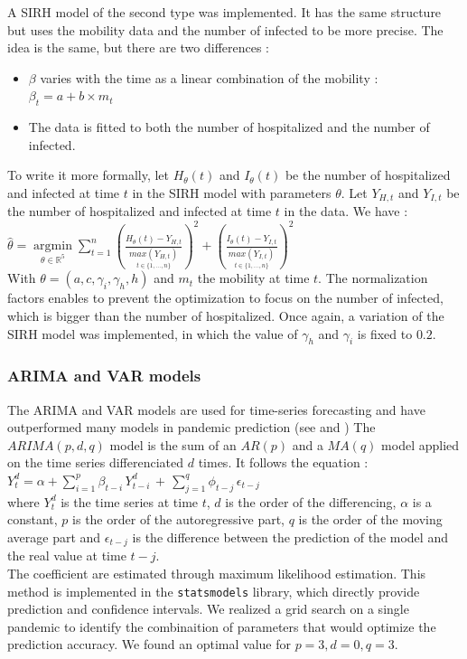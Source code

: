 A SIRH model of the second type was implemented. 
It has the same structure but uses the mobility data and the number of infected to be more precise. 
The idea is the same, but there are two differences : 
\begin{itemize}
    \item $\beta$ varies with the time as a linear combination of the mobility : $\beta_t = a + b \times m_t$ 
    \item The data is fitted to both the number of hospitalized and the number of infected. 
\end{itemize}
To write it more formally, let $H_\theta(t)$ and $I_\theta(t)$ be the number of hospitalized and infected at time $t$ in the SIRH model with parameters $\theta$.
Let $Y_{H, t}$ and $Y_{I, t}$ be the number of hospitalized and infected at time $t$ in the data.
We have :\\

$\hat{\theta} = \underset{\theta \in \mathbb{R}^5}{\operatorname{argmin}} \sum_{t=1}^{n} (\frac{H_\theta(t) - Y_{H, t}}{\underset{t \in \{1, ..., n \}}{max(Y_{H, t})}})^2 + (\frac{I_\theta(t) - Y_{I, t}}{\underset{t \in \{1, ..., n \}}{max(Y_{I, t})}})^2$\\

With $\theta = (a, c, \gamma_i, \gamma_h, h)$ and $m_t$ the mobility at time $t$.
The normalization factors enables to prevent the optimization to focus on the number of infected, which is bigger than the number of hospitalized. 
Once again, a variation of the SIRH model was implemented, in which the value of $\gamma_h$ and $\gamma_i$ is fixed to $0.2$. 



\subsubsection{ARIMA and VAR models} 

The ARIMA and VAR models are used for time-series forecasting and have outperformed many models in pandemic prediction (see \cite[text]{kufel2020arima} and \cite[text]{shang2021regional})
The $ARIMA(p, d, q)$ model is the sum of an $AR(p)$ and a $MA(q)$ model applied on the time series differenciated $d$ times. 
It follows the equation : \\
$Y_{t}^{d}=\alpha+\sum_{i=1}^{p}\beta_{t-i}\,Y_{t-i}^{d}\,+\,\sum_{j=1}^{q}\phi_{t-j}\,\epsilon_{t-j}$\\
where $Y_{t}^{d}$ is the time series at time $t$, $d$ is the order of the differencing, $\alpha$ is a constant, $p$ is the order of the autoregressive part, $q$ is the order of the moving average part and $\epsilon_{t-j}$ is the difference between the prediction of the model and the real value at time $t-j$.\\
The coefficient are estimated through maximum likelihood estimation. 
This method is implemented in the \texttt{statsmodels} library, which directly provide prediction and confidence intervals.
We realized a grid search on a single pandemic to identify the combinaition of parameters that would optimize the prediction accuracy. 
We found an optimal value for $p= 3, d=0, q=3$. 


